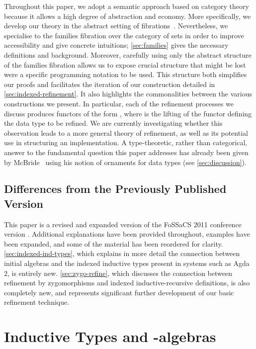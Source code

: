\documentclass{LMCS}
\begin{document}
Throughout this paper, we adopt a semantic approach based on category
theory because it allows a high degree of abstraction and
economy. More specifically, we develop our theory in the abstract
setting of fibrations~\cite{jacobs99book}. Nevertheless, we specialise
to the families fibration over the category of sets in order to
improve accessibility and give concrete intuitions;
\autoref{sec:families} gives the necessary definitions and
background. Moreover, carefully using only the abstract structure of
the families fibration allows us to expose crucial structure that
might be lost were a specific programming notation to be used. This
structure both simplifies our proofs and facilitates the iteration of
our construction detailed in \autoref{sec:indexed-refinement}. It also
highlights the commonalities between the various constructions we
present. In particular, each of the refinement processes we discuss
produces functors of the form , where  is
the lifting of the functor  defining the data type  to be
refined. We are currently investigating whether this observation leads
to a more general theory of refinement, as well as its potential use
in structuring an implementation. A type-theoretic, rather than
categorical, answer to the fundamental question this paper addresses
has already been given by McBride~\cite{mcbride10ornaments} using his
notion of ornaments for data types (see \autoref{sec:discussion}).

\subsection{Differences from the Previously Published Version}

This paper is a revised and expanded version of the FoSSaCS 2011
conference version \cite{atkey11refinement}. Additional explanations
have been provided throughout, examples have been expanded, and some
of the material has been reordered for
clarity. \autoref{sec:indexed-ind-types}, which explains in more
detail the connection between initial algebras and the indexed
inductive types present in systems such as Agda 2, is entirely
new. \autoref{sec:zygo-refine}, which discusses the connection between
refinement by zygomorphisms and indexed inductive-recursive
definitions, is also completely new, and represents significant
further development of our basic refinement technique.

\section{Inductive Types and -algebras}\label{sec:f-algebras}
\end{document}
